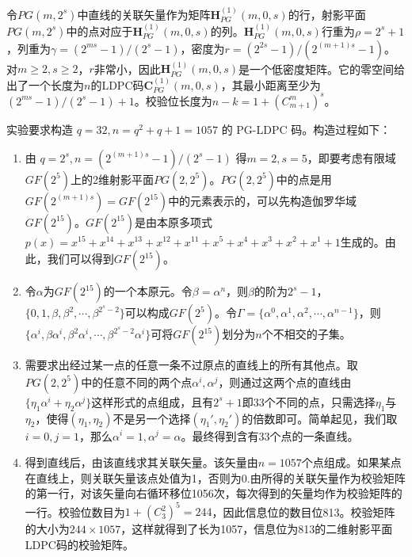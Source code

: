 \documentclass[lang=cn,11pt,a4paper,numbers]{elegantpaper}
\begin{document}
令$PG(m,2^s)$中直线的关联矢量作为矩阵$\boldsymbol{H}_{PG}^{(1)}(m,0,s)$的行，射影平面$PG(m,2^s)$中的点对应于$\boldsymbol{H}_{PG}^{(1)}(m,0,s)$的列。$\boldsymbol{H}_{PG}^{(1)}(m,0,s)$行重为$\rho=2^s+1$，列重为$\displaystyle{\gamma=(2^{ms}-1)/(2^s-1)}$，密度为$\displaystyle{r=(2^{2s}-1)/(2^{(m+1)s}-1)}$。对$m\geq 2,s\geq 2$，$r$非常小，因此$\boldsymbol{H}_{PG}^{(1)}(m,0,s)$是一个低密度矩阵。它的零空间给出了一个长度为$n$的LDPC码$\boldsymbol{C}_{PG}^{(1)}(m,0,s)$，其最小距离至少为$(2^{ms}-1)/(2^s-1)+1$。校验位长度为$n-k=1+(C_{m+1}^m)^s$。

实验要求构造 $q=32, n=q^2+q+1=1057$ 的 PG-LDPC 码。构造过程如下：
\begin{enumerate}[1)]
    \item 由 $\displaystyle{q=2^s, n=(2^{(m+1)s}-1)/(2^s-1)}$ 得$m=2,s=5$，即要考虑有限域$GF(2^5)$上的2维射影平面$PG(2,2^5)$。$PG(2,2^5)$中的点是用$GF(2^{(m+1)s})=GF(2^{15})$中的元素表示的，可以先构造伽罗华域$GF(2^{15})$。$GF(2^{15})$是由本原多项式$p(x)=x^{15}+x^{14}+x^{13}+x^{12}+x^{11}+x^5+x^4+x^3+x^2+x^1+1$生成的。由此，我们可以得到$GF(2^{15})$。
    \item 令$\alpha$为$GF(2^{15})$的一个本原元。令$\beta=\alpha^n$，则$\beta$的阶为$2^s-1$，$\{0,1,\beta,\beta^2,\cdots,\beta^{2^s-2}\}$可以构成$GF(2^5)$。令$\Gamma = \{\alpha^0,\alpha^1,\alpha^2,\cdots,\alpha^{n-1}\}$，则$\{\alpha^i,\beta\alpha^i,\beta^2\alpha^i,\cdots,\beta^{2^s-2}\alpha^i\}$可将$GF(2^{15})$划分为$n$个不相交的子集。
    \item 需要求出经过某一点的任意一条不过原点的直线上的所有其他点。取$PG(2,2^5)$中的任意不同的两个点$\alpha^i,\alpha^j$，则通过这两个点的直线由$\{\eta_1\alpha^i+\eta_2\alpha^j\}$这样形式的点组成，且有$2^s+1$即33个不同的点，只需选择$\eta_1$与$\eta_2$，使得$(\eta_1,\eta_2)$不是另一个选择$(\eta_1',\eta_2')$的倍数即可。简单起见，我们取$i=0,j=1$，那么$\alpha^i=1,\alpha^j=\alpha$。最终得到含有33个点的一条直线。
    \item 得到直线后，由该直线求其关联矢量。该矢量由$n=1057$个点组成。如果某点在直线上，则关联矢量该点处值为1，否则为0.由所得的关联矢量作为校验矩阵的第一行，对该矢量向右循环移位1056次，每次得到的矢量均作为校验矩阵的一行。校验位数目为$1+(C_3^2)^5=244$，因此信息位的数目位813。校验矩阵的大小为$244\times 1057$，这样就得到了长为1057，信息位为813的二维射影平面LDPC码的校验矩阵。
\end{enumerate}
\end{document}
